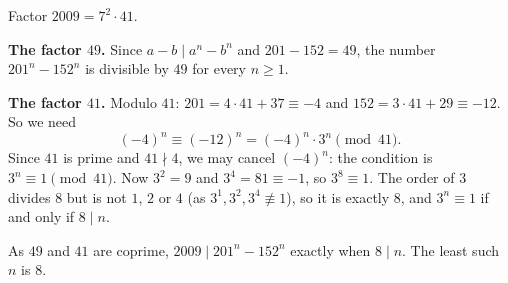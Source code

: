 Factor $2009=7^2\cdot41$.

\textbf{The factor $49$.} Since $a-b\mid a^n-b^n$ and $201-152=49$, the number $201^n-152^n$ is divisible by $49$ for every $n\ge1$.

\textbf{The factor $41$.} Modulo $41$: $201=4\cdot41+37\equiv-4$ and $152=3\cdot41+29\equiv-12$. So we need
\[(-4)^n\equiv(-12)^n=(-4)^n\cdot3^n\pmod{41}.\]
Since $41$ is prime and $41\nmid4$, we may cancel $(-4)^n$: the condition is $3^n\equiv1\pmod{41}$. Now $3^2=9$ and $3^4=81\equiv-1$, so $3^8\equiv1$. The order of $3$ divides $8$ but is not $1$, $2$ or $4$ (as $3^1,3^2,3^4\not\equiv1$), so it is exactly $8$, and $3^n\equiv1$ if and only if $8\mid n$.

As $49$ and $41$ are coprime, $2009\mid201^n-152^n$ exactly when $8\mid n$. The least such $n$ is $\boxed{8}$.
